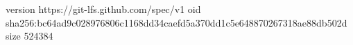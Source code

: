version https://git-lfs.github.com/spec/v1
oid sha256:bc64ad9c028976806c1168dd34caefd5a370dd1c5e648870267318ae88db502d
size 524384
